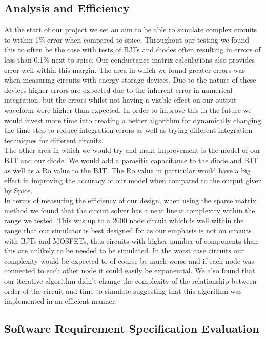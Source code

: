 \documentclass{article}
\begin{document}
\newpage

\subsection{Analysis and Efficiency }
At the start of our project we set an aim to be able to simulate complex circuits to within 1\% error when compared to spice. Throughout our testing we found this to often be the case with tests of BJTs and diodes often resulting in errors of less than 0.1\% next to spice. Our conductance matrix calculations also provides error well within this margin. The area in which we found greater errors was when measuring circuits with energy storage devices. Due to the nature of these devices higher errors are expected due to the inherent error in numerical integration, but the errors whilst not having a visible effect on our output waveform were higher than expected. In order to improve this in the future we would invest more time into creating a better algorithm for dynamically changing the time step to reduce integration errors as well as trying different integration techniques for different circuits. \\The other area in which we would try and make improvement is the model of our BJT and our diode. We would add a parasitic capacitance to the diode and BJT as well as a Ro value to the BJT. The Ro value in particular would have a big effect in improving the accuracy of our model when compared to the output given by Spice. \\In terms of measuring the efficiency of our design, when using the sparse matrix method we found that the circuit solver has a near linear complexity within the range we tested. This was up to a 2000 node circuit which is well within the range that our simulator is best designed for as our emphasis is not on circuits with BJTs and MOSFETs, thus circuits with higher number of components than this are unlikely to be needed to be simulated. In the worst case circuits our complexity would be expected to of course be much worse and if each node was connected to each other node it could easily be exponential. We also found that our iterative algorithm didn't change the complexity of the relationship between order of the circuit and time to simulate suggesting that this algorithm was implemented in an efficient manner. 
\newpage
\subsection{Software Requirement Specification Evaluation}
\end{document}
